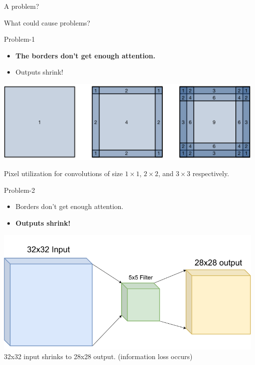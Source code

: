 \documentclass[default, aspectratio=169]{beamer}
\begin{document}
	\begin{frame}{A problem?}
		\begin{center}
			\LARGE What could cause problems?
		\end{center}
	\end{frame}
	\begin{frame}{Problem-1}
		
		\begin{itemize}
			\item \Large \textbf{The borders don't get enough attention.}
			\item \Large Outputs shrink!
		\end{itemize}
		
		\centering
		\includegraphics[keepaspectratio, scale=0.4]{pic/padding1.png}
		
		\small Pixel utilization for convolutions of size $1 \times 1$, $2 \times 2$, and $3 \times 3$ respectively.
	\end{frame}
	\begin{frame}{Problem-2}
		
		\begin{itemize}
			\item \Large Borders don't get enough attention.
			\item \Large \textbf{Outputs shrink!}
		\end{itemize}
		
		\centering
		\includegraphics[keepaspectratio, scale=0.25]{pic/Padding2.png}
		\smallskip
		\small 32x32 input shrinks to 28x28 output. (information loss occurs)
	\end{frame}
\end{document}
